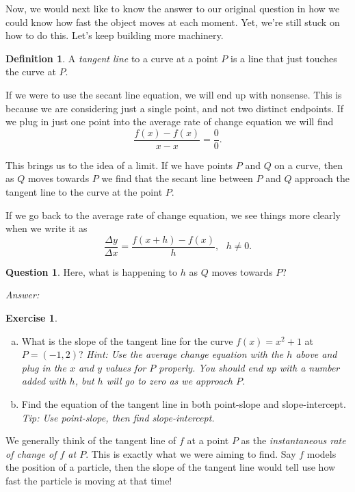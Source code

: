 \documentclass[leqno]{article}
\theoremstyle{definition}
\newtheorem{definition}{Definition}[section]
\newtheorem{question}{Question}[section]
\newtheorem{exercise}{Exercise}[section]
\theoremstyle{remark}
\theoremstyle{theorem}
\begin{document}
Now, we would next like to know the answer to our original question in how we could know how fast the object moves at each moment.  Yet, we're still stuck on how to do this.  Let's keep building more machinery.

\begin{definition}
A \emph{tangent line} to a curve at a point $P$ is a line that just touches the curve at $P$.
\end{definition}
\vspace*{4cm}

If we were to use the secant line equation, we will end up with nonsense. This is because we are considering just a single point, and not two distinct endpoints.  If we plug in just one point into the average rate of change equation we will find 
\[
\frac{f(x)-f(x)}{x-x}=\frac{0}{0}.
\]

This brings us to the idea of a limit.  If we have points $P$ and $Q$ on a curve, then as $Q$ moves towards $P$ we find that the secant line between $P$ and $Q$ approach the tangent line to the curve at the point $P$.
\vspace*{4cm}

If we go back to the average rate of change equation, we see things more clearly when we write it as
\[
\frac{\Delta y}{\Delta x}=\frac{f(x+h)-f(x)}{h}, ~~~ h\neq 0.
\]

\begin{question}
Here, what is happening to $h$ as $Q$ moves towards $P$?
\end{question}

\noindent \emph{Answer:} 
\vspace*{2cm}

\begin{exercise}~
\begin{enumerate}[(a)]
\item What is the slope of the tangent line for the curve $f(x)=x^2+1$ at $P=(-1,2)$? \emph{Hint: Use the average change equation with the $h$ above and plug in the $x$ and $y$ values for $P$ properly. You should end up with a number added with $h$, but $h$ will go to zero as we approach $P$.}
\item Find the equation of the tangent line in both point-slope and slope-intercept.  \emph{Tip: Use point-slope,  then find slope-intercept.}
\end{enumerate}
\end{exercise}
\vspace*{6cm}

We generally think of the tangent line of $f$ at a point $P$ as the \emph{instantaneous rate of change of $f$ at $P$}.  This is exactly what we were aiming to find. Say $f$ models the position of a particle, then the slope of the tangent line would tell use how fast the particle is moving at that time!
\end{document}
